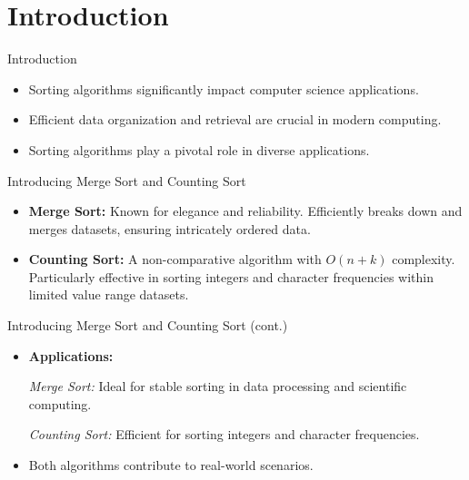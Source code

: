 \documentclass{beamer}
\begin{document}
	\section{Introduction}
	
	\begin{frame}{Introduction}
		\begin{itemize}
			\item Sorting algorithms significantly impact computer science applications.
	
			\item Efficient data organization and retrieval are crucial in modern computing.
			
			\item Sorting algorithms play a pivotal role in diverse applications.
			
		\end{itemize}
	\end{frame}
	
	\begin{frame}{Introducing Merge Sort and Counting Sort}
		\begin{itemize}
			\item \textbf{Merge Sort:} Known for elegance and reliability. Efficiently breaks down and merges datasets, ensuring intricately ordered data.
			
			\item \textbf{Counting Sort:} A non-comparative algorithm with $O(n + k)$ complexity. Particularly effective in sorting integers and character frequencies within limited value range datasets.
		\end{itemize}
	\end{frame}
	
	\begin{frame}{Introducing Merge Sort and Counting Sort (cont.)}
		\begin{itemize}
			
			\item \textbf{Applications:}
			
			\textit{Merge Sort:} Ideal for stable sorting in data processing and scientific computing.
			
			\textit{Counting Sort:} Efficient for sorting integers and character frequencies.
			
			\item Both algorithms contribute to real-world scenarios.
		\end{itemize}
	\end{frame}
	
\end{document}
